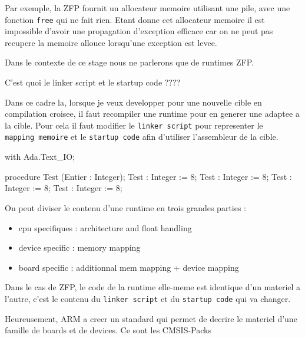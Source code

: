 \documentclass[11pt,]{article}
\newenvironment{Shaded}{\begin{snugshade}}{\end{snugshade}}
\newcommand{\KeywordTok}[1]{\textcolor[rgb]{0.94,0.87,0.69}{#1}}
\newcommand{\DataTypeTok}[1]{\textcolor[rgb]{0.87,0.87,0.75}{#1}}
\newcommand{\DecValTok}[1]{\textcolor[rgb]{0.86,0.86,0.80}{#1}}
\newcommand{\NormalTok}[1]{\textcolor[rgb]{0.80,0.80,0.80}{#1}}
\providecommand{\tightlist}{%
  \setlength{\itemsep}{0pt}\setlength{\parskip}{0pt}}
\begin{document}
Par exemple, la ZFP fournit un allocateur memoire utilisant une pile,
avec une fonction \texttt{free} qui ne fait rien. Etant donne cet
allocateur memoire il est impossible d'avoir une propagation d'exception
efficace car on ne peut pas recupere la memoire allouee lorsqu'une
exception est levee.

Dans le contexte de ce stage nous ne parlerons que de runtimes ZFP.

C'est quoi le linker script et le startup code ????

Dans ce cadre la, lorsque je veux developper pour une nouvelle cible en
compilation croisee, il faut recompiler une runtime pour en generer une
adaptee a la cible. Pour cela il faut modifier le
\texttt{linker\ script} pour representer le \texttt{mapping\ memoire} et
le \texttt{startup\ code} afin d'utiliser l'assembleur de la cible.

\begin{Shaded}
\begin{Highlighting}[]
\KeywordTok{with}\NormalTok{ Ada.Text_IO;}

\KeywordTok{procedure}\NormalTok{ Test (Entier : }\DataTypeTok{Integer}\NormalTok{);}
\NormalTok{Test : }\DataTypeTok{Integer}\NormalTok{ := }\DecValTok{8}\NormalTok{;}
\NormalTok{Test : }\DataTypeTok{Integer}\NormalTok{ := }\DecValTok{8}\NormalTok{;}
\NormalTok{Test : }\DataTypeTok{Integer}\NormalTok{ := }\DecValTok{8}\NormalTok{;}
\NormalTok{Test : }\DataTypeTok{Integer}\NormalTok{ := }\DecValTok{8}\NormalTok{;}
\end{Highlighting}
\end{Shaded}

On peut diviser le contenu d'une runtime en trois grandes parties :

\begin{itemize}
\tightlist
\item
  cpu specifiques : architecture and float handling
\item
  device specific : memory mapping
\item
  board specific : additionnal mem mapping + device mapping
\end{itemize}

Dans le cas de ZFP, le code de la runtime elle-meme est identique d'un
materiel a l'autre, c'est le contenu du \texttt{linker\ script} et du
\texttt{startup\ code} qui va changer.

Heureusement, ARM a creer un standard qui permet de decrire le materiel
d'une famille de boards et de devices. Ce sont les CMSIS-Packs
\end{document}
